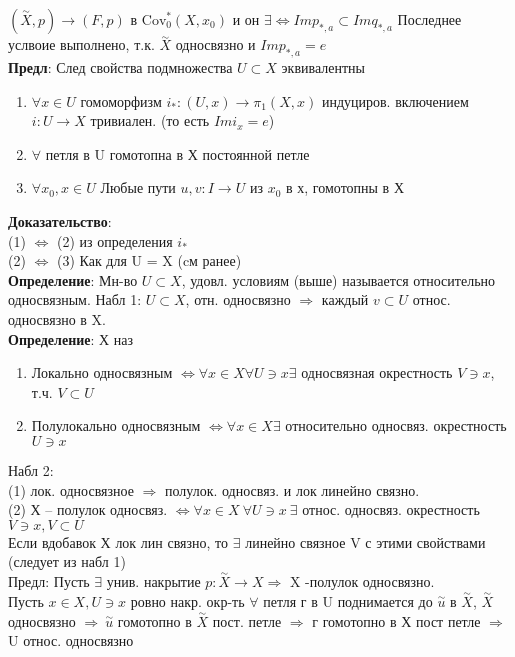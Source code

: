 	$(\overset{\sim}{X}, p) \rightarrow (F,p)$ в $\text{Cov}_{0}^{*}(X,x_0)$ и он $\exists \Leftrightarrow Im p_{*,a} \subset Im q_{*,a}$ Последнее услвоие выполнено, т.к. $\overset{\sim}{X}$ односвязно и $Im p_{*,a} = {e}$\\
	\textbf{Предл}: След свойства подмножества $U\subset X$ эквивалентны\\
	\begin{enumerate}
	\item $\forall x \in U$ гомоморфизм $i_{*}: (U,x)\rightarrow \pi_1(X,x)$ индуциров. включением $i: U\rightarrow X$ тривиален. (то есть $Im i_x = {e}$)
	\item $\forall$ петля в U гомотопна в Х постоянной петле
	\item $\forall x_0, x \in U$ Любые пути $u,v: I\rightarrow U$ из $x_0$ в х, гомотопны в Х
	\end{enumerate}
	\textbf{Доказательство}:\\
	(1) $\Leftrightarrow$ (2) из определения $i_{*}$\\
	(2) $\Leftrightarrow$ (3) Как для U = X (cм ранее)\\
	\textbf{Определение}: Мн-во $U \subset X$, удовл. условиям (выше) называется относительно односвязным.
	Набл 1: $U \subset X$, отн. односвязно $\Rightarrow$ каждый $v \subset U $ относ. односвязно в X.\\
	\textbf{Определение}: Х наз\\
	\begin{enumerate}
	\item Локально односвязным $\Leftrightarrow \forall x\in X \forall U\ni x \exists$ односвязная окрестность $V\ni x$, т.ч. $V\subset U$
	\item Полулокально односвязным $\Leftrightarrow \forall x\in X \exists$ относительно односвяз. окрестность $U\ni x$
	\end{enumerate}
	Набл 2:\\
	(1) лок. односвязное $\Rightarrow$ полулок. односвяз. и лок линейно связно.\\
	(2) Х -- полулок односвяз. $\Leftrightarrow \forall x \in X\ \forall U\ni x\ \exists$ относ. односвяз. окрестность $V\ni x, V\subset U$\\
	Если вдобавок Х лок лин связно, то $\exists$ линейно связное V с этими свойствами (следует из набл 1)\\
	Предл: Пусть $\exists$ унив. накрытие $p: \overset{\sim}{X} \rightarrow X \Rightarrow$ X -полулок односвязно.\\
	Пусть $x\in X, U\ni x$ ровно накр. окр-ть $\forall$ петля г в U поднимается до $\overset{\sim}{u}$ в $\overset{\sim}{X}$, $\overset{\sim}{X}$ односвязно $\Rightarrow\ \overset{\sim}{u}$ гомотопно в $\overset{\sim}{X}$ пост. петле $\Rightarrow$ г гомотопно в Х пост петле $\Rightarrow$ U относ. односвязно
	


